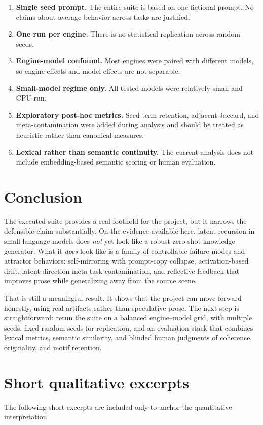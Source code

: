 \documentclass[11pt]{article}
\begin{document}
\begin{enumerate}[leftmargin=1.5em]
    \item \textbf{Single seed prompt.} The entire suite is based on one fictional prompt. No claims about average behavior across tasks are justified.
    \item \textbf{One run per engine.} There is no statistical replication across random seeds.
    \item \textbf{Engine-model confound.} Most engines were paired with different models, so engine effects and model effects are not separable.
    \item \textbf{Small-model regime only.} All tested models were relatively small and CPU-run.
    \item \textbf{Exploratory post-hoc metrics.} Seed-term retention, adjacent Jaccard, and meta-contamination were added during analysis and should be treated as heuristic rather than canonical measures.
    \item \textbf{Lexical rather than semantic continuity.} The current analysis does not include embedding-based semantic scoring or human evaluation.
\end{enumerate}

\section{Conclusion}
The executed suite provides a real foothold for the project, but it narrows the defensible claim substantially. On the evidence available here, latent recursion in small language models does \emph{not} yet look like a robust zero-shot knowledge generator. What it \emph{does} look like is a family of controllable failure modes and attractor behaviors: self-mirroring with prompt-copy collapse, activation-based drift, latent-direction meta-task contamination, and reflective feedback that improves prose while generalizing away from the source scene.

That is still a meaningful result. It shows that the project can move forward honestly, using real artifacts rather than speculative prose. The next step is straightforward: rerun the suite on a balanced engine--model grid, with multiple seeds, fixed random seeds for replication, and an evaluation stack that combines lexical metrics, semantic similarity, and blinded human judgments of coherence, originality, and motif retention.

\appendix
\section{Short qualitative excerpts}
The following short excerpts are included only to anchor the quantitative interpretation.
\end{document}
